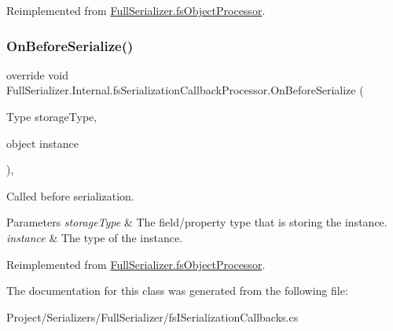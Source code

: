 Reimplemented from \hyperlink{class_full_serializer_1_1fs_object_processor_a99e0c1a7d896539470bbe7f43565a5a3}{Full\+Serializer.\+fs\+Object\+Processor}.

\mbox{\label{class_full_serializer_1_1_internal_1_1fs_serialization_callback_processor_adee2943e2bf0bacad3957dfb15b32de8}} 
\subsubsection{\texorpdfstring{On\+Before\+Serialize()}{OnBeforeSerialize()}}
{\footnotesize\ttfamily override void Full\+Serializer.\+Internal.\+fs\+Serialization\+Callback\+Processor.\+On\+Before\+Serialize (\begin{DoxyParamCaption}\item[{Type}]{storage\+Type,  }\item[{object}]{instance }\end{DoxyParamCaption})\hspace{0.3cm}{\ttfamily [inline]}, {\ttfamily [virtual]}}



Called before serialization. 


\begin{DoxyParams}{Parameters}
{\em storage\+Type} & The field/property type that is storing the instance.\\
\hline
{\em instance} & The type of the instance.\\
\hline
\end{DoxyParams}


Reimplemented from \hyperlink{class_full_serializer_1_1fs_object_processor_a48818569c78a826069594fb5ce6e32f2}{Full\+Serializer.\+fs\+Object\+Processor}.



The documentation for this class was generated from the following file\+:\begin{DoxyCompactItemize}
\item 
Project/\+Serializers/\+Full\+Serializer/fs\+I\+Serialization\+Callbacks.\+cs\end{DoxyCompactItemize}
